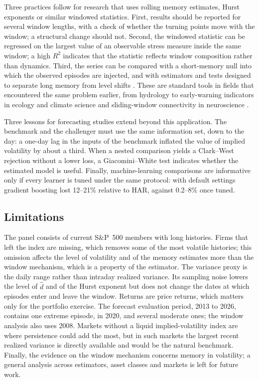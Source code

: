 Three practices follow for research that uses rolling memory estimates,
Hurst exponents or similar windowed statistics. First, results should be
reported for several window lengths, with a check of whether the turning
points move with the window; a structural change should not. Second, the
windowed statistic can be regressed on the largest value of an observable
stress measure inside the same window; a high $R^2$ indicates that the
statistic reflects window composition rather than dynamics. Third, the
series can be compared with a short-memory null into which the observed
episodes are injected, and with estimators and tests designed to separate
long memory from level shifts \citep{qu2011test, hou2014modified}. These are
standard tools in fields that encountered the same problem earlier, from
hydrology \citep{klemes1974hurst} to early-warning indicators in ecology and
climate science \citep{dakos2008slowing, ditlevsen2010tipping,
boettiger2012quantifying} and sliding-window connectivity in neuroscience
\citep{leonardi2015spurious}.

Three lessons for forecasting studies extend beyond this application. The
benchmark and the challenger must use the same information set, down to the
day: a one-day lag in the inputs of the benchmark inflated the value of
implied volatility by about a third. When a nested comparison yields a
Clark--West rejection without a lower loss, a Giacomini--White test indicates
whether the estimated model is useful. Finally, machine-learning comparisons
are informative only if every learner is tuned under the same protocol: with
default settings gradient boosting lost 12--21\% relative to HAR, against
0.2--8\% once tuned.

\subsection{Limitations}

The panel consists of current S\&P~500 members with long histories. Firms
that left the index are missing, which removes some of the most volatile
histories; this omission affects the level of volatility and of the memory
estimates more than the window mechanism, which is a property of the
estimator. The variance proxy is the daily range rather than intraday
realized variance. Its sampling noise lowers the level of $\hat d$ and of the
Hurst exponent but does not change the dates at which episodes enter and
leave the window. Returns are price returns, which matters only for the
portfolio exercise. The forecast evaluation period, 2013 to 2026, contains
one extreme episode, in 2020, and several moderate ones; the window analysis
also uses 2008. Markets without a liquid implied-volatility index are where
persistence could add the most, but in such markets the largest recent
realized variance is directly available and would be the natural benchmark.
Finally, the evidence on the window mechanism concerns memory in volatility;
a general analysis across estimators, asset classes and markets is left for
future work.

